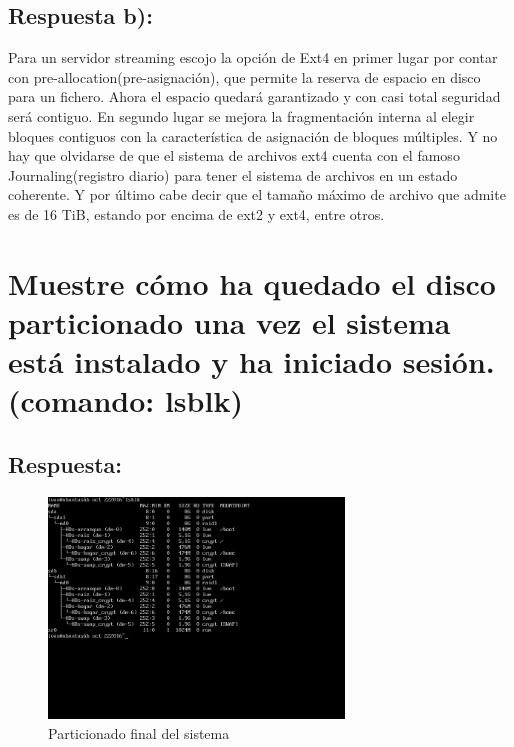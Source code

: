 \subsection{Respuesta b):}
Para un servidor streaming escojo la opción de Ext4 en primer lugar por contar con pre-allocation(pre-asignación), que permite la reserva de espacio en disco para un fichero. Ahora el espacio quedará garantizado y con casi total seguridad será contiguo. En segundo lugar se mejora la fragmentación interna al elegir bloques contiguos con la característica de asignación de bloques múltiples. Y no hay que olvidarse de que el sistema de archivos ext4 cuenta con el famoso Journaling(registro diario) para tener el sistema de archivos en un estado coherente. 
	Y por último cabe decir que el tamaño máximo de archivo que admite es de 16 TiB, estando por encima de ext2 y ext4, entre otros.
\cite{RedHatSFext4}

\section{Muestre cómo ha quedado el disco particionado una vez el sistema está instalado y ha iniciado sesión.(comando: lsblk)}
\subsection{Respuesta:}
\begin{figure}[H]
	\begin{center}
		\includegraphics[width=0.7\textwidth]{Imagenes/Disco-final-particionado}
		\caption{Particionado final del sistema} \label{fig:figura1}
	\end{center}
\end{figure}

